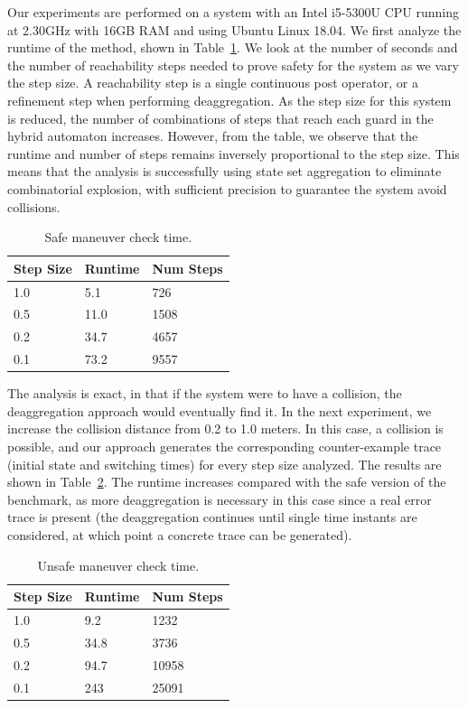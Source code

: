 Our experiments are performed on a system with an Intel i5-5300U CPU running at 2.30GHz with 16GB RAM and using Ubuntu Linux 18.04.
%
We first analyze the runtime of the method, shown in Table~\ref{tab:runtime}.
%
We look at the number of seconds and the number of reachability steps needed to prove safety for the system as we vary the step size.
%
A reachability step is a single continuous post operator, or a refinement step when performing deaggregation.
%
As the step size for this system is reduced, the number of combinations of steps that reach each guard in the hybrid automaton increases.
%
However, from the table, we observe that the runtime and number of steps remains inversely proportional to the step size.
%
This means that the analysis is successfully using state set aggregation to eliminate combinatorial explosion, with sufficient
precision to guarantee the system avoid collisions.

\setlength{\tabcolsep}{2pt}
\begin{table}[t]
\caption{Safe maneuver check time.}
\label{tab:runtime}
\centering
\setlength{\aboverulesep}{0.0pt}
\setlength{\belowrulesep}{0.0pt}
\setlength{\extrarowheight}{-0.2ex}
\begin{tabular}{@{}lll@{}}
  \toprule
  Step Size & Runtime & Num Steps \\
  \midrule
  1.0 & 5.1 & 726 \\
  0.5 & 11.0 & 1508 \\
  0.2 & 34.7 & 4657 \\
  0.1 & 73.2 & 9557 \\
\bottomrule
\end{tabular}
\end{table}

The analysis is exact, in that if the system were to have a collision, the deaggregation approach would eventually find it.
%
In the next experiment, we increase the collision distance from 0.2 to 1.0 meters.
%
In this case, a collision is possible, and our approach generates the corresponding counter-example trace (initial state and switching times)
for every step size analyzed.
%
The results are shown in Table~\ref{tab:runtime_unsafe}.
%
The runtime increases compared with the safe version of the benchmark, as more deaggregation is necessary in this case since a real error trace is
present (the deaggregation continues until single time instants are considered, at which point a concrete trace can be generated).

\setlength{\tabcolsep}{2pt}
\begin{table}[t]
\caption{Unsafe maneuver check time.}
\label{tab:runtime_unsafe}
\centering
\setlength{\aboverulesep}{0.0pt}
\setlength{\belowrulesep}{0.0pt}
\setlength{\extrarowheight}{.0ex}
\begin{tabular}{@{}lll@{}}
  \toprule
  Step Size & Runtime & Num Steps \\
  \midrule
  1.0 & 9.2 & 1232 \\
  0.5 & 34.8 & 3736 \\
  0.2 & 94.7 & 10958 \\
  0.1 & 243 & 25091 \\
\bottomrule
\end{tabular}
\end{table}

